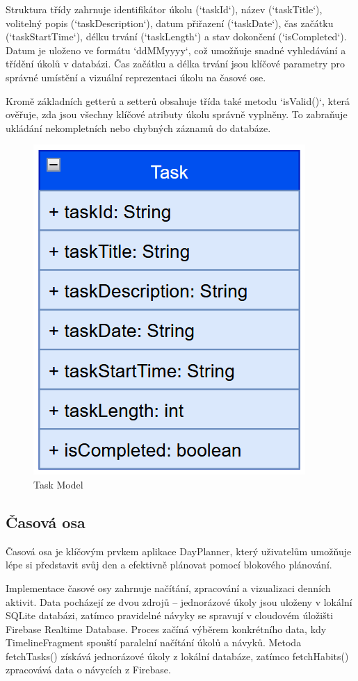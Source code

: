 Struktura třídy zahrnuje identifikátor úkolu (`taskId`), název (`taskTitle`), volitelný popis (`taskDescription`), datum přiřazení (`taskDate`), čas začátku (`taskStartTime`), délku trvání (`taskLength`) a stav dokončení (`isCompleted`). Datum je uloženo ve formátu `ddMMyyyy`, což umožňuje snadné vyhledávání a třídění úkolů v databázi. Čas začátku a délka trvání jsou klíčové parametry pro správné umístění a vizuální reprezentaci úkolu na časové ose.  

Kromě základních getterů a setterů obsahuje třída také metodu `isValid()`, která ověřuje, zda jsou všechny klíčové atributy úkolu správně vyplněny. To zabraňuje ukládání nekompletních nebo chybných záznamů do databáze.  

\begin{figure}[H]
    \centering
    \includegraphics[width=0.4\linewidth]{images/TASK.png}
    \caption{Task Model}
    \label{fig:task-model}
\end{figure}
\newpage
\subsection{Časová osa}
\hspace{14pt} Časová osa je klíčovým prvkem aplikace DayPlanner, který uživatelům umožňuje lépe si představit svůj den a efektivně plánovat pomocí blokového plánování.

Implementace časové osy zahrnuje načítání, zpracování a vizualizaci denních aktivit. Data pocházejí ze dvou zdrojů – jednorázové úkoly jsou uloženy v lokální SQLite databázi, zatímco pravidelné návyky se spravují v cloudovém úložišti Firebase Realtime Database. Proces začíná výběrem konkrétního data, kdy TimelineFragment spouští paralelní načítání úkolů a návyků. Metoda fetchTasks() získává jednorázové úkoly z lokální databáze, zatímco fetchHabits() zpracovává data o návycích z Firebase.

